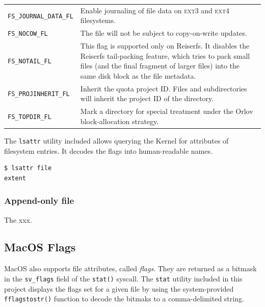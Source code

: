 \documentclass[a4paper]{article}
\begin{document}
\begin{table}
\begin{tabular}{@{}lp{8cm}@{}}
\verb|FS_JOURNAL_DATA_FL|
& Enable journaling of file data on \textsc{ext3} and \textsc{ext4} filesystems.\\

\verb|FS_NOCOW_FL|
& The file will not be subject to copy-on-write updates.\\

\verb|FS_NOTAIL_FL|
& This flag is supported only on Reiserfs.  It disables the Reiserfs tail-packing feature, which tries to pack small files (and the final fragment of larger files)  into  the  same  disk block as the file metadata.\\

\verb|FS_PROJINHERIT_FL|
& Inherit the quota project ID.  Files and subdirectories will inherit the project ID of the directory.\\

\verb|FS_TOPDIR_FL|
& Mark a directory for special treatment under the Orlov block-allocation strategy.\\
\bottomrule
\end{tabular}
\end{table}

The \verb|lsattr| utility included allows querying the Kernel for attributes of filesystem entries. It decodes the flags into human-readable names.

\begin{verbatim}
$ lsattr file
extent
\end{verbatim}

\subsubsection{Append-only file}

The xxx.

\subsection{MacOS Flags}



MacOS also supports file attributes, called \emph{flags}. They are returned as a bitmask in the \verb|sv_flags| field of the \verb|stat()| syscall. The \verb|stat| utility included in this project displays the flags set for a given file by using the system-provided \verb|fflagstostr()| function to decode the bitmaks to a comma-delimited string.
\end{document}
